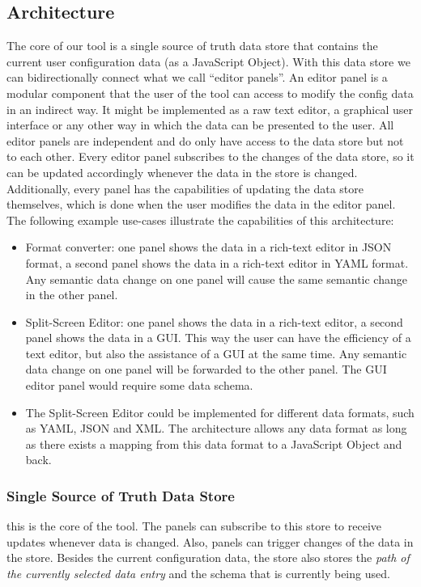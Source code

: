 \subsection{Architecture}\label{subsec:architecture} %
The core of our tool is a single source of truth data store that contains the current user configuration data (as a JavaScript Object).
With this data store we can bidirectionally connect what we call ``editor panels''.
An editor panel is a modular component that the user of the tool can access to modify the config data in an indirect way.
It might be implemented as a raw text editor, a graphical user interface or any other way in which the data can be presented to the user.
All editor panels are independent and do only have access to the data store but not to each other.
Every editor panel subscribes to the changes of the data store, so it can be updated accordingly whenever the data in the store is changed.
Additionally, every panel has the capabilities of updating the data store themselves, which is done when the user modifies the data in the editor panel.
The following example use-cases illustrate the capabilities of this architecture:

\begin{itemize}
    \item Format converter: one panel shows the data in a rich-text editor in JSON format, a second panel shows the data in a rich-text editor in YAML format. Any semantic data change on one panel will cause the same semantic change in the other panel.
    \item Split-Screen Editor: one panel shows the data in a rich-text editor, a second panel shows the data in a GUI. This way the user can have the efficiency of a text editor, but also the assistance of a GUI at the same time. Any semantic data change on one panel will be forwarded to the other panel. The GUI editor panel would require some data schema.
    \item The Split-Screen Editor could be implemented for different data formats, such as YAML, JSON and XML. The architecture allows any data format as long as there exists a mapping from this data format to a JavaScript Object and back.
\end{itemize}



\subsubsection{Single Source of Truth Data Store}
this is the core of the tool.
The panels can subscribe to this store to receive updates whenever data is changed.
Also, panels can trigger changes of the data in the store.
Besides the current configuration data, the store also stores the \textit{path of the currently selected data entry} and the schema that is currently being used.

